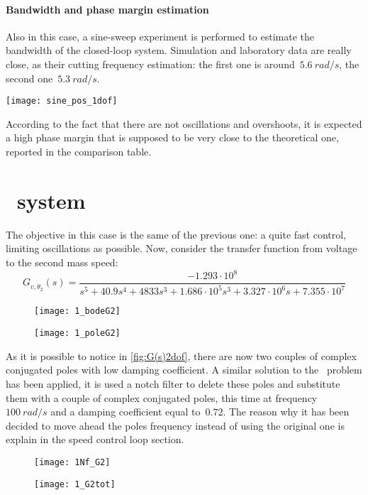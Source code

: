 \paragraph{Bandwidth and phase margin estimation}
Also in this case, a sine-sweep experiment is performed to estimate the bandwidth of the closed-loop system. Simulation and laboratory data are really close, as their cutting frequency estimation: the first one is around~$5.6\ rad/s$, the second one~$5.3\ rad/s$.
\begin{figure*}[h]
	\centering
	\texttt{[image: sine\_pos\_1dof]}
	\caption{Sine-sweep experiment from $0.1\ Hz$ to $1\ Hz$ in $100\ s$}
	\label{fig:sinesweep_pos_1dof}
\end{figure*}
According to the fact that there are not oscillations and overshoots, it is expected a high phase margin that is supposed to be very close to the theoretical one, reported in the comparison table.

\section{\twodof\ system}
The objective in this case is the same of the previous one: a quite fast control, limiting oscillations as possible. Now, consider the transfer function from voltage to the second mass speed:
\[
G_{v,\dot{\theta}_2}(s)=
\frac{-1.293 \cdot 10^{8}}{s^5+40.9s^{4}+4833s^{3}+1.686 \cdot 10^{5} s^{3}+3.327 \cdot 10^{6} s+7.355 \cdot 10^{7}}
\]
\begin{figure*}[h]
	\centering
	\begin{subfigure}{0.4\columnwidth}
		\texttt{[image: 1\_bodeG2]}
	\end{subfigure}
	\begin{subfigure}{0.4\columnwidth}
		\texttt{[image: 1\_poleG2]}
	\end{subfigure}
	\caption{G(s)}
	\label{fig:G(s)2dof}
\end{figure*}

As it is possible to notice in \cref{fig:G(s)2dof}, there are now two couples of complex conjugated poles with low damping coefficient. A similar solution to the \onedof\ problem has been applied, it is used a notch filter to delete these poles and substitute them with a couple of complex conjugated poles, this time at frequency~$100\ rad/s$ and a damping coefficient equal to~$0.72$. The reason why it has been decided to move ahead the poles frequency instead of using the original one is explain in the speed control loop section.
\begin{figure*}[h]
	\centering
	\begin{subfigure}{0.45\columnwidth}
		\texttt{[image: 1Nf\_G2]}
		\label{fig:Notch Filter2}
	\end{subfigure}
	\begin{subfigure}{0.45\columnwidth}
		\texttt{[image: 1\_G2tot]}
		\label{fig:Plant G(s) with Notch Filter2}
	\end{subfigure}
	\caption{Plant $G(s)$ with Notch Filter $N_f(s)$: $G_{tot}$(s)}
\end{figure*}

